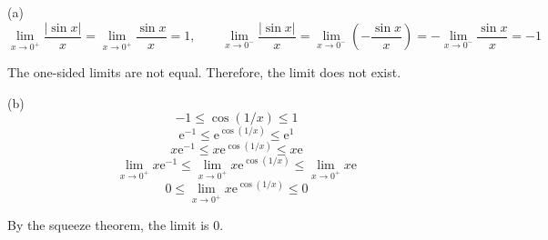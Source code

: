 \documentclass{article}
\begin{document}
\noindent (a) \begin{equation*}\lim_{x\to 0^+} \frac{\left|\sin x\right|}{x}=\lim_{x\to 0^+}\frac{\sin x}{x}=1,\quad\quad \lim_{x\to 0^-} \frac{\left|\sin x\right|}{x}=\lim_{x\to0^-}\left(-\frac{\sin x}{x}\right)=-\lim_{x\to0^-}\frac{\sin x}{x}=-1\end{equation*}

\hfill

\noindent The one-sided limits are not equal. Therefore, the limit does not exist.

\hfill

\noindent (b)
\begin{equation*}-1\leq \cos(1/x)\leq1\end{equation*}
\begin{equation*}\mathrm{e}^{-1}\leq\mathrm{e}^{\cos(1/x)}\leq\mathrm{e}^1\end{equation*}
\begin{equation*}x\mathrm{e}^{-1}\leq x\mathrm{e}^{\cos(1/x)}\leq x\mathrm{e}\end{equation*}
\begin{equation*}\lim_{x\to 0^+} x\mathrm{e}^{-1}\leq\lim_{x\to 0^+}  x\mathrm{e}^{\cos(1/x)}\leq\lim_{x\to 0^+} x\mathrm{e}\end{equation*}
\begin{equation*}0\leq\lim_{x\to 0^+} x\mathrm{e}^{\cos(1/x)}\leq0\end{equation*}

\hfill

\noindent By the squeeze theorem, the limit is 0.

\hfill
\end{document}

